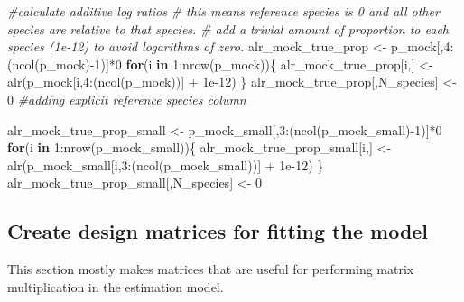 \documentclass[
]{article}
\newenvironment{Shaded}{\begin{snugshade}}{\end{snugshade}}
\newcommand{\CommentTok}[1]{\textcolor[rgb]{0.56,0.35,0.01}{\textit{#1}}}
\newcommand{\ControlFlowTok}[1]{\textcolor[rgb]{0.13,0.29,0.53}{\textbf{#1}}}
\newcommand{\DecValTok}[1]{\textcolor[rgb]{0.00,0.00,0.81}{#1}}
\newcommand{\FloatTok}[1]{\textcolor[rgb]{0.00,0.00,0.81}{#1}}
\newcommand{\FunctionTok}[1]{\textcolor[rgb]{0.00,0.00,0.00}{#1}}
\newcommand{\NormalTok}[1]{#1}
\newcommand{\OtherTok}[1]{\textcolor[rgb]{0.56,0.35,0.01}{#1}}
\newcommand{\SpecialCharTok}[1]{\textcolor[rgb]{0.00,0.00,0.00}{#1}}
\begin{document}
\begin{Shaded}
\begin{Highlighting}[]
  \CommentTok{\#calculate additive log ratios}
  \CommentTok{\# this means reference species is 0 and all other species are relative to that species.}
  \CommentTok{\# add a trivial amount of proportion to each species (1e{-}12) to avoid logarithms of zero.}
\NormalTok{  alr\_mock\_true\_prop }\OtherTok{\textless{}{-}}\NormalTok{ p\_mock[,}\DecValTok{4}\SpecialCharTok{:}\NormalTok{(}\FunctionTok{ncol}\NormalTok{(p\_mock)}\SpecialCharTok{{-}}\DecValTok{1}\NormalTok{)]}\SpecialCharTok{*}\DecValTok{0}
  \ControlFlowTok{for}\NormalTok{(i }\ControlFlowTok{in} \DecValTok{1}\SpecialCharTok{:}\FunctionTok{nrow}\NormalTok{(p\_mock))\{}
\NormalTok{    alr\_mock\_true\_prop[i,] }\OtherTok{\textless{}{-}} \FunctionTok{alr}\NormalTok{(p\_mock[i,}\DecValTok{4}\SpecialCharTok{:}\NormalTok{(}\FunctionTok{ncol}\NormalTok{(p\_mock))] }\SpecialCharTok{+} \FloatTok{1e{-}12}\NormalTok{)}
\NormalTok{  \}}
\NormalTok{  alr\_mock\_true\_prop[,N\_species] }\OtherTok{\textless{}{-}} \DecValTok{0} \CommentTok{\#adding explicit reference species column}
  
\NormalTok{  alr\_mock\_true\_prop\_small }\OtherTok{\textless{}{-}}\NormalTok{ p\_mock\_small[,}\DecValTok{3}\SpecialCharTok{:}\NormalTok{(}\FunctionTok{ncol}\NormalTok{(p\_mock\_small)}\SpecialCharTok{{-}}\DecValTok{1}\NormalTok{)]}\SpecialCharTok{*}\DecValTok{0}
  \ControlFlowTok{for}\NormalTok{(i }\ControlFlowTok{in} \DecValTok{1}\SpecialCharTok{:}\FunctionTok{nrow}\NormalTok{(p\_mock\_small))\{}
\NormalTok{    alr\_mock\_true\_prop\_small[i,] }\OtherTok{\textless{}{-}} \FunctionTok{alr}\NormalTok{(p\_mock\_small[i,}\DecValTok{3}\SpecialCharTok{:}\NormalTok{(}\FunctionTok{ncol}\NormalTok{(p\_mock\_small))] }\SpecialCharTok{+} \FloatTok{1e{-}12}\NormalTok{)}
\NormalTok{  \}}
\NormalTok{  alr\_mock\_true\_prop\_small[,N\_species] }\OtherTok{\textless{}{-}} \DecValTok{0} 
\end{Highlighting}
\end{Shaded}

\hypertarget{create-design-matrices-for-fitting-the-model}{%
\subsection{Create design matrices for fitting the
model}\label{create-design-matrices-for-fitting-the-model}}

This section mostly makes matrices that are useful for performing matrix
multiplication in the estimation model.
\end{document}
